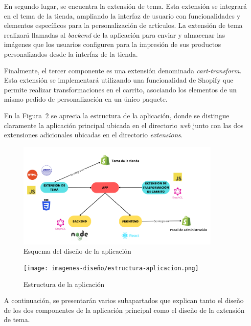 \documentclass[11pt]{article}
\begin{document}
En segundo lugar, se encuentra la extensión de tema. Esta extensión se integrará en el tema de la tienda, 
ampliando la interfaz de usuario con funcionalidades y elementos específicos para la personalización de artículos. 
La extensión de tema realizará llamadas al \textit{backend} de la aplicación para enviar y almacenar las imágenes que los usuarios 
configuren para la impresión de sus productos personalizados desde la interfaz de la tienda.

Finalmente, el tercer componente es una extensión denominada \textit{cart-transform}. Esta extensión se implementará utilizando 
una funcionalidad de Shopify que permite realizar transformaciones en el carrito, asociando los elementos de un mismo 
pedido de personalización en un único paquete.

En la Figura~\ref{fig:esquemaAplicacionReal} se aprecia la estructura de la aplicación, donde se distingue claramente
la aplicación principal ubicada en el directorio \textit{web} junto con las dos extensiones adicionales ubicadas en el directorio \textit{extensions}.

\begin{figure}[H]
    \centering
    \includegraphics[width=0.9\textwidth]{imagenes-diseño/Esquema de diseño de la aplicación.png}
    \caption{\label{fig:esquemaAplicacion}Esquema del diseño de la aplicación}
    \vspace{\fill}
\end{figure}

\begin{figure}[H]
    \centering
    \texttt{[image: imagenes-diseño/estructura-aplicacion.png]}
    \caption{\label{fig:esquemaAplicacionReal}Estructura de la aplicación}
    \vspace{\fill}
\end{figure}

A continuación, se presentarán varios subapartados que explican tanto el diseño de los dos componentes
de la aplicación principal como el diseño de la extensión de tema. 
\end{document}
